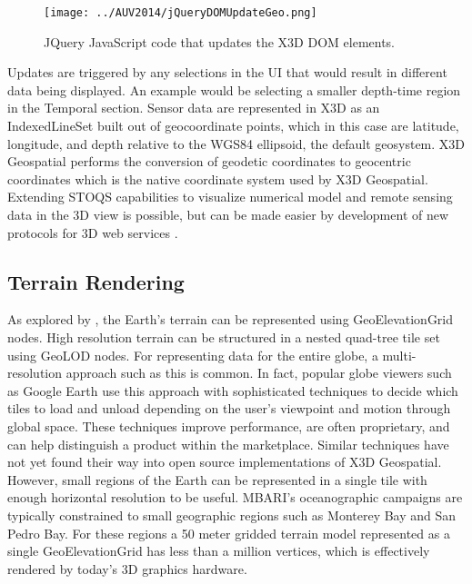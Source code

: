 \documentclass[conference]{IEEEtran}
\begin{document}
\begin{figure}[!htbp]
\centering
\texttt{[image: ../AUV2014/jQueryDOMUpdateGeo.png]}
\caption{JQuery JavaScript code that updates the X3D DOM elements.}
\label{fig:jQueryDOMUpdateGeo}
\end{figure}

Updates are triggered by any selections in the UI that would result in different data being displayed. An example would be selecting a smaller depth-time region in the Temporal section. Sensor data are represented in X3D as an IndexedLineSet built out of geocoordinate points, which in this case are latitude, longitude, and depth relative to the WGS84 ellipsoid, the default geosystem. X3D Geospatial performs the conversion of geodetic coordinates to geocentric coordinates which is the native coordinate system used by X3D Geospatial. Extending STOQS capabilities to visualize numerical model and remote sensing data in the 3D view is possible, but can be made easier by development of new protocols for 3D web services \cite{McCann:2014:IXG:2628588.2628609}.

\subsection{Terrain Rendering}

As explored by \cite{yoo09}, the Earth's terrain can be represented using GeoElevationGrid nodes. High resolution terrain can be structured in a nested quad-tree tile set using GeoLOD nodes. For representing data for the entire globe, a multi-resolution approach such as this is common. In fact, popular globe viewers such as Google Earth use this approach with sophisticated techniques to decide which tiles to load and unload depending on the user's viewpoint and motion through global space. These techniques improve performance, are often proprietary, and can help distinguish a product within the marketplace. Similar techniques have not yet found their way into open source implementations of X3D Geospatial. However, small regions of the Earth can be represented in a single tile with enough horizontal resolution to be useful. MBARI's oceanographic campaigns are typically constrained to small geographic regions such as Monterey Bay and San Pedro Bay. For these regions a 50 meter gridded terrain model represented as a single GeoElevationGrid has less than a million vertices, which is effectively  rendered by today's 3D graphics hardware.
\end{document}
